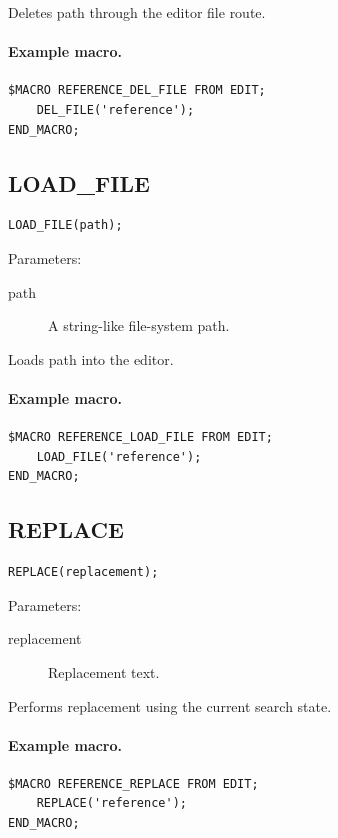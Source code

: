 \documentclass[a4paper,10pt,twoside,openany]{book}
\begin{document}
Deletes path through the editor file route.

\paragraph{Example macro.}
\begin{verbatim}
$MACRO REFERENCE_DEL_FILE FROM EDIT;
    DEL_FILE('reference');
END_MACRO;
\end{verbatim}

\label{prim:procedure-load-file}
\subsection*{LOAD\_FILE}
\begin{verbatim}
LOAD_FILE(path);
\end{verbatim}
Parameters:
\begin{description}
\item[path] A string-like file-system path.
\end{description}

Loads path into the editor.

\paragraph{Example macro.}
\begin{verbatim}
$MACRO REFERENCE_LOAD_FILE FROM EDIT;
    LOAD_FILE('reference');
END_MACRO;
\end{verbatim}

\label{prim:procedure-replace}
\subsection*{REPLACE}
\begin{verbatim}
REPLACE(replacement);
\end{verbatim}
Parameters:
\begin{description}
\item[replacement] Replacement text.
\end{description}

Performs replacement using the current search state.

\paragraph{Example macro.}
\begin{verbatim}
$MACRO REFERENCE_REPLACE FROM EDIT;
    REPLACE('reference');
END_MACRO;
\end{verbatim}
\end{document}

